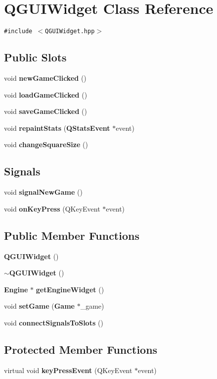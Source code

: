 \section{QGUIWidget Class Reference}
\label{classQGUIWidget}
{\tt \#include $<$QGUIWidget.hpp$>$}

\subsection*{Public Slots}
\begin{CompactItemize}
\item 
void {\bf new\-Game\-Clicked} ()
\item 
void {\bf load\-Game\-Clicked} ()
\item 
void {\bf save\-Game\-Clicked} ()
\item 
void {\bf repaint\-Stats} ({\bf QStats\-Event} $\ast$event)
\item 
void {\bf change\-Square\-Size} ()
\end{CompactItemize}
\subsection*{Signals}
\begin{CompactItemize}
\item 
void {\bf signal\-New\-Game} ()
\item 
void {\bf on\-Key\-Press} (QKey\-Event $\ast$event)
\end{CompactItemize}
\subsection*{Public Member Functions}
\begin{CompactItemize}
\item 
{\bf QGUIWidget} ()
\item 
{\bf $\sim$QGUIWidget} ()
\item 
{\bf Engine} $\ast$ {\bf get\-Engine\-Widget} ()
\item 
void {\bf set\-Game} ({\bf Game} $\ast$\_\-game)
\item 
void {\bf connect\-Signals\-To\-Slots} ()
\end{CompactItemize}
\subsection*{Protected Member Functions}
\begin{CompactItemize}
\item 
virtual void {\bf key\-Press\-Event} (QKey\-Event $\ast$event)
\end{CompactItemize}
